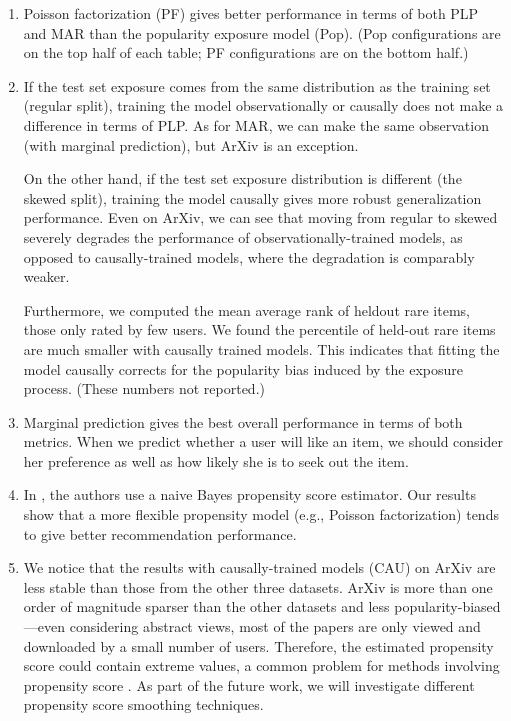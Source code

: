 \begin{enumerate}[leftmargin=*]
\item Poisson factorization (PF) gives better performance in terms of
  both PLP and MAR than the popularity exposure model (Pop). (Pop
  configurations are on the top half of each table; PF
  configurations are on the bottom half.)

\item If the test set exposure comes from the same distribution as the
  training set (regular split), training the model observationally or
  causally does not make a difference in terms of PLP. As for MAR,
  we can make the same observation (with marginal
  prediction), but ArXiv is an exception.

  On the other hand, if the test set exposure distribution is
  different (the skewed split), training the model causally gives more
  robust generalization performance. Even on ArXiv, we can see that
  moving from regular to skewed severely degrades the performance of
  observationally-trained models, as opposed to causally-trained
  models, where the degradation is comparably weaker.

  Furthermore, we computed the mean average rank of heldout rare
  items, those only rated by few users. We found the percentile
  of held-out rare items are much smaller with causally trained models.
  This indicates that fitting the model causally corrects for the
  popularity bias induced by the exposure process.  (These numbers not
  reported.)

\item Marginal prediction gives the best overall performance in
  terms of both metrics. When we predict whether
  a user will like an item, we should consider her preference as well
  as how likely she is to seek out the item.

\item In \citet{schnabel16treatment}, the authors use a naive Bayes
  propensity score estimator. Our results show that a more
  flexible propensity model (e.g., Poisson factorization) tends to
  give better recommendation performance.

\item We notice that the results with causally-trained models
  (CAU) on ArXiv are less stable than those from the other three
  datasets. ArXiv is more than one order of magnitude sparser than the
  other datasets and less popularity-biased---even considering
  abstract views, most of the papers are only viewed and downloaded by
  a small number of users. Therefore, the estimated propensity score
  could contain extreme values, a common problem for methods involving
  propensity score \citep{morgan2014counterfactuals}. As part of the
  future work, we will investigate different propensity score
  smoothing techniques.
\end{enumerate}


